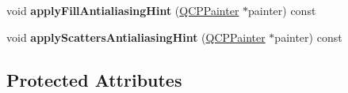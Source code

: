\begin{DoxyCompactItemize}
\item 
void {\bfseries apply\+Fill\+Antialiasing\+Hint} (\hyperlink{classQCPPainter}{Q\+C\+P\+Painter} $\ast$painter) const \hypertarget{classQCPAbstractPlottable_ac08a480155895e674dbfe5a5670e0ff3}{}\label{classQCPAbstractPlottable_ac08a480155895e674dbfe5a5670e0ff3}

\item 
void {\bfseries apply\+Scatters\+Antialiasing\+Hint} (\hyperlink{classQCPPainter}{Q\+C\+P\+Painter} $\ast$painter) const \hypertarget{classQCPAbstractPlottable_a753272ee225a62827e90c3e1e78de4b1}{}\label{classQCPAbstractPlottable_a753272ee225a62827e90c3e1e78de4b1}

\end{DoxyCompactItemize}
\subsection*{Protected Attributes}
